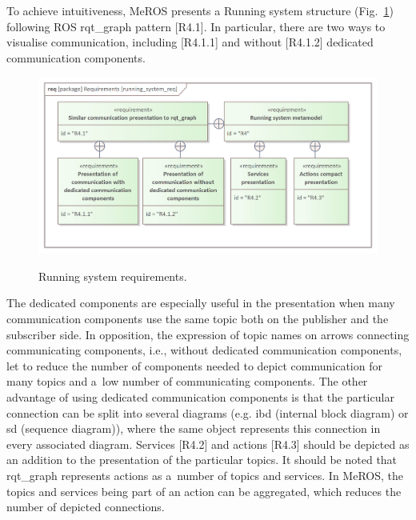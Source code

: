 \documentclass[11pt,oneside,a4paper]{article}
\begin{document}


	
	\pagebreak
	
	To achieve intuitiveness, MeROS presents a Running system structure (Fig.~\ref{fig:running_system_req}) following ROS rqt\_graph pattern [R4.1]. In particular, there are two ways to visualise communication, including [R4.1.1] and without [R4.1.2]
	dedicated communication components.
	\begin{figure}[H]
		\centering
		\begin{center}
			{\includegraphics[scale=0.9]{img/requirement_pkg/running_system_req.png}}
		\end{center}
		\caption{Running system requirements.} 
		\label{fig:running_system_req}
	\end{figure}
	 The dedicated components are especially useful in the presentation when many communication components use the same topic both on the publisher and the subscriber side. In opposition, the expression of topic names on arrows connecting communicating components, i.e., without dedicated communication components, let to reduce the number of components needed to depict communication for many topics and a~low number of communicating components. The other advantage of using dedicated communication components is that the particular connection can be split into several diagrams (e.g. ibd (internal block diagram) or sd (sequence diagram)), where the same object represents this connection in every associated diagram. Services [R4.2] and actions [R4.3] should be depicted as an addition to the presentation of the particular topics. It should be noted that rqt\_graph represents actions as a~number of topics and services. In MeROS, the topics and services being part of an action can be aggregated, which reduces the number of depicted connections.
		
\end{document}
